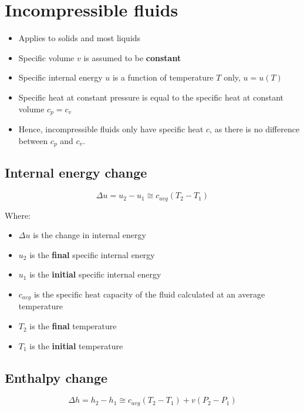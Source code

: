 \documentclass[11pt]{article}
\begin{document}
\newpage

\section{Incompressible fluids}
\label{sec:org541873a}
\begin{itemize}
\item Applies to solids and most liquids
\item Specific volume \(v\) is assumed to be \textbf{constant}
\item Specific internal energy \(u\) is a function of temperature \(T\) only, \(u = u(T)\)
\item Specific heat at constant pressure is equal to the specific heat at constant volume \(c_p = c_v\)
\item Hence, incompressible fluids only have specific heat \(c\), as there is no difference between \(c_p\) and \(c_v\).
\end{itemize}

\subsection{Internal energy change}
\label{sec:org4260041}
\[\Delta u = u_2 - u_1 \cong c_{avg} \left(T_2 - T_1 \right)\]

Where:
\begin{itemize}
\item \(\Delta u\) is the change in internal energy
\item \(u_2\) is the \textbf{final} specific internal energy
\item \(u_1\) is the \textbf{initial} specific internal energy
\item \(c_{avg}\) is the specific heat capacity of the fluid calculated at an average temperature
\item \(T_2\) is the \textbf{final} temperature
\item \(T_1\) is the \textbf{initial} temperature
\end{itemize}

\newpage

\subsection{Enthalpy change}
\label{sec:orga9d235f}
\[\Delta h = h_2 - h_1 \cong c_{avg} \left(T_2 - T_1 \right) + v \left(P_2 - P_1 \right)\]
\end{document}
